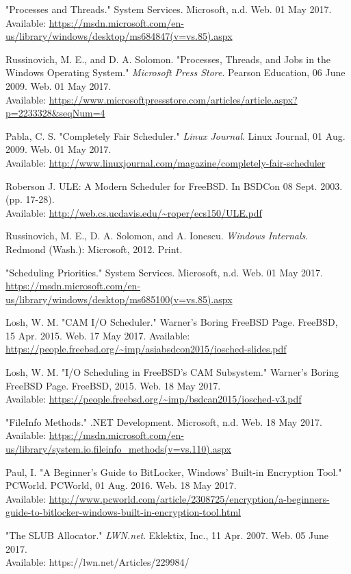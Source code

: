 \documentclass[10pt,draftclsnofoot,onecolumn,journal,compsoc]{IEEEtran}
\begin{document}
\begin{thebibliography}{18}
"Processes and Threads." System Services. Microsoft, n.d. Web. 01 May 2017. \\
Available: \url{https://msdn.microsoft.com/en-us/library/windows/desktop/ms684847(v=vs.85).aspx}

Russinovich, M. E., and D. A. Solomon. "Processes, Threads, and Jobs in the Windows Operating System." \textit{Microsoft Press Store}. Pearson Education, 06 June 2009. Web. 01 May 2017. \\
Available: \url{https://www.microsoftpressstore.com/articles/article.aspx?p=2233328&seqNum=4}

Pabla, C. S. "Completely Fair Scheduler." \textit{Linux Journal}. Linux Journal, 01 Aug. 2009. Web. 01 May 2017. \\
Available: \url{http://www.linuxjournal.com/magazine/completely-fair-scheduler}

Roberson J. ULE: A Modern Scheduler for FreeBSD. In BSDCon 08 Sept. 2003. (pp. 17-28). \\
Available: \url{http://web.cs.ucdavis.edu/~roper/ecs150/ULE.pdf}

Russinovich, M. E., D. A. Solomon, and A. Ionescu. \textit{Windows Internals}. Redmond (Wash.): Microsoft, 2012. Print.

"Scheduling Priorities." System Services. Microsoft, n.d. Web. 01 May 2017. \\
\url{https://msdn.microsoft.com/en-us/library/windows/desktop/ms685100(v=vs.85).aspx}

Losh, W. M. "CAM I/O Scheduler." Warner's Boring FreeBSD Page. FreeBSD, 15 Apr. 2015. Web. 17 May 2017.
Available: \url{https://people.freebsd.org/~imp/asiabsdcon2015/iosched-slides.pdf}

Losh, W. M. "I/O Scheduling in FreeBSD’s CAM Subsystem." Warner's Boring FreeBSD Page. FreeBSD, 2015. Web. 18 May 2017. \\
Available: \url{https://people.freebsd.org/~imp/bsdcan2015/iosched-v3.pdf}

"FileInfo Methods." .NET Development. Microsoft, n.d. Web. 18 May 2017. \\
Available: \url{https://msdn.microsoft.com/en-us/library/system.io.fileinfo_methods(v=vs.110).aspx}

Paul, I. "A Beginner's Guide to BitLocker, Windows' Built-in Encryption Tool." PCWorld. PCWorld, 01 Aug. 2016. Web. 18 May 2017. \\
Available: \url{http://www.pcworld.com/article/2308725/encryption/a-beginners-guide-to-bitlocker-windows-built-in-encryption-tool.html}

"The SLUB Allocator." \textit{LWN.net}. Eklektix, Inc., 11 Apr. 2007. Web. 05 June 2017. \\
Available: https://lwn.net/Articles/229984/


\end{thebibliography}
\end{document}
